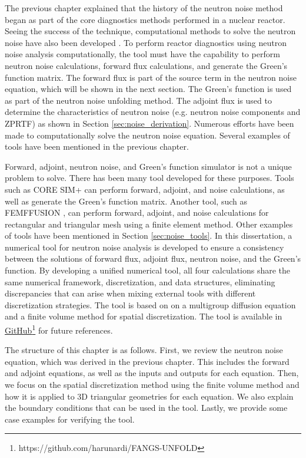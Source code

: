 \label{ch:simulations}

The previous chapter explained that the history of the neutron noise method began as part of the core diagnostics methods performed in a nuclear reactor. Seeing the success of the technique, computational methods to solve the neutron noise have also been developed \cite{demaziereCORTEXProjectImproving2020}. To perform reactor diagnostics using neutron noise analysis computationally, the tool must have the capability to perform neutron noise calculations, forward flux calculations, and generate the Green’s function matrix. The forward flux is part of the source term in the neutron noise equation, which will be shown in the next section. The Green’s function is used as part of the neutron noise unfolding method. The adjoint flux is used to determine the characteristics of neutron noise (e.g. neutron noise components and ZPRTF) as shown in Section \ref{sec:noise_derivation}. Numerous efforts have been made to computationally solve the neutron noise equation. Several examples of tools have been mentioned in the previous chapter.

Forward, adjoint, neutron noise, and Green's function simulator is not a unique problem to solve. There has been many tool developed for these purposes. Tools such as CORE SIM+ \cite{mylonakisCORESIMFlexible2021} can perform forward, adjoint, and noise calculations, as well as generate the Green’s function matrix. Another tool, such as FEMFFUSION \cite{vidal-ferrandizFEMFFUSIONFiniteElement2023}, can perform forward, adjoint, and noise calculations for rectangular and triangular mesh using a finite element method. Other examples of tools have been mentioned in Section \ref{sec:noise_tools}. In this dissertation, a numerical tool for neutron noise analysis is developed to ensure a consistency between the solutions of forward flux, adjoint flux, neutron noise, and the Green's function. By developing a unified numerical tool, all four calculations share the same numerical framework, discretization, and data structures, eliminating discrepancies that can arise when mixing external tools with different discretization strategies. The tool is based on on a multigroup diffusion equation and a finite volume method for spatial discretization. The tool is available in \href{https://github.com/harunardi/FANGS-UNFOLD}{GitHub}\footnote{https://github.com/harunardi/FANGS-UNFOLD} for future references.

The structure of this chapter is as follows. First, we review the neutron noise equation, which was derived in the previous chapter. This includes the forward and adjoint equations, as well as the inputs and outputs for each equation. Then, we focus on the spatial discretization method using the finite volume method and how it is applied to 3D triangular geometries for each equation. We also explain the boundary conditions that can be used in the tool. Lastly, we provide some case examples for verifying the tool.

